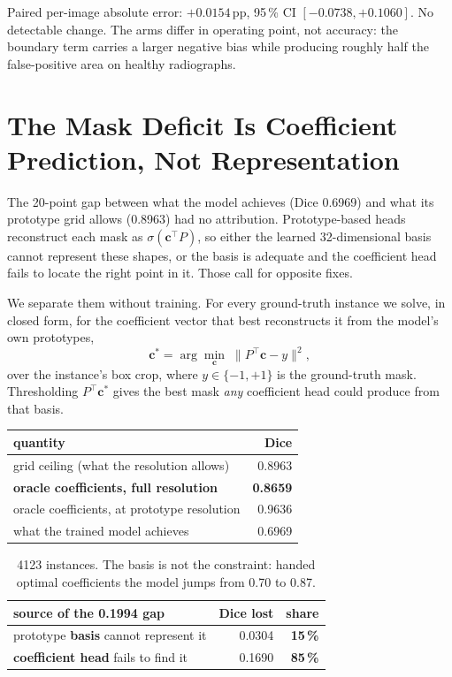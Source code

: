 \documentclass[11pt,letterpaper]{article}
\begin{document}
Paired per-image absolute error: $+0.0154$\,pp, 95\,\% CI
$[-0.0738,+0.1060]$. No detectable change. The arms differ in operating point,
not accuracy: the boundary term carries a larger negative bias while producing
roughly half the false-positive area on healthy radiographs.



\section{The Mask Deficit Is Coefficient Prediction, Not Representation}

The 20-point gap between what the model achieves (Dice 0.6969) and what its
prototype grid allows (0.8963) had no attribution. Prototype-based heads
reconstruct each mask as $\sigma(\mathbf{c}^\top P)$, so either the learned
32-dimensional basis cannot represent these shapes, or the basis is adequate and
the coefficient head fails to locate the right point in it. Those call for
opposite fixes.

We separate them without training. For every ground-truth instance we solve, in
closed form, for the coefficient vector that best reconstructs it from the
model's own prototypes,
\begin{equation}
\mathbf{c}^{*} = \arg\min_{\mathbf{c}} \; \lVert P^{\top}\mathbf{c} - y \rVert^{2},
\end{equation}
over the instance's box crop, where $y\in\{-1,+1\}$ is the ground-truth mask.
Thresholding $P^{\top}\mathbf{c}^{*}$ gives the best mask \emph{any} coefficient
head could produce from that basis.

\begin{table}[h]
\centering\small
\begin{tabular}{lr}
\toprule
quantity & Dice \\
\midrule
grid ceiling (what the resolution allows) & 0.8963 \\
\textbf{oracle coefficients, full resolution} & \textbf{0.8659} \\
oracle coefficients, at prototype resolution & 0.9636 \\
what the trained model achieves & 0.6969 \\
\bottomrule
\end{tabular}
\end{table}

\begin{table}[h]
\centering\small
\begin{tabular}{lrr}
\toprule
source of the 0.1994 gap & Dice lost & share \\
\midrule
prototype \textbf{basis} cannot represent it & 0.0304 & \textbf{15\,\%} \\
\textbf{coefficient head} fails to find it & 0.1690 & \textbf{85\,\%} \\
\bottomrule
\end{tabular}
\caption{4123 instances. The basis is not the constraint: handed optimal
coefficients the model jumps from 0.70 to 0.87.}
\end{table}
\end{document}
